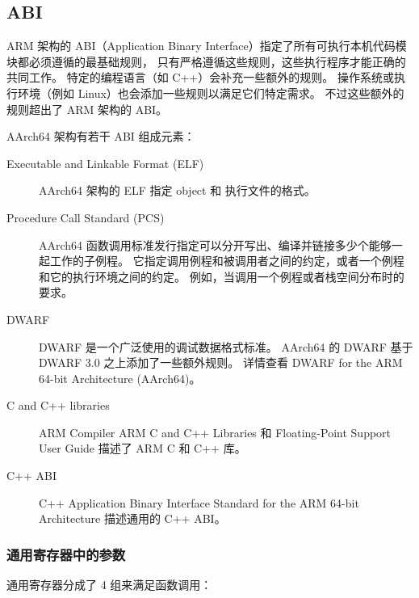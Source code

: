 \subsection{ABI}

ARM 架构的 ABI（Application Binary Interface）指定了所有可执行本机代码模块都必须遵循的最基础规则，
只有严格遵循这些规则，这些执行程序才能正确的共同工作。
特定的编程语言（如 C++）会补充一些额外的规则。
操作系统或执行环境（例如 Linux）也会添加一些规则以满足它们特定需求。
不过这些额外的规则超出了 ARM 架构的 ABI。

AArch64 架构有若干 ABI 组成元素：

\begin{description}
  \item[Executable and Linkable Format (ELF)]
    AArch64 架构的 ELF 指定 object 和 执行文件的格式。
  \item[Procedure Call Standard (PCS)]
    AArch64 函数调用标准发行指定可以分开写出、编译并链接多少个能够一起工作的子例程。
    它指定调用例程和被调用者之间的约定，或者一个例程和它的执行环境之间的约定。
    例如，当调用一个例程或者栈空间分布时的要求。
  \item[DWARF]
    DWARF 是一个广泛使用的调试数据格式标准。
    AArch64 的 DWARF 基于 DWARF 3.0 之上添加了一些额外规则。
    详情查看 DWARF for the ARM 64-bit Architecture (AArch64)。
  \item[C and C++ libraries]
    ARM Compiler ARM C and C++ Libraries 和 Floating-Point Support User Guide 描述了 ARM C 和 C++ 库。
  \item[C++ ABI]
    C++ Application Binary Interface Standard for the ARM 64-bit Architecture 描述通用的 C++ ABI。
\end{description}

\subsubsection{通用寄存器中的参数}

通用寄存器分成了 4 组来满足函数调用：

